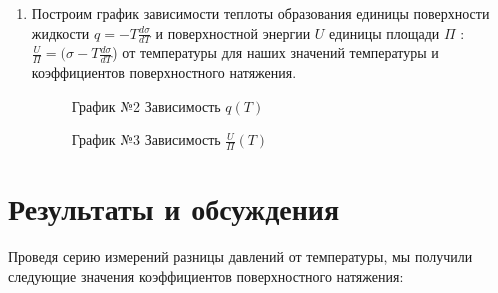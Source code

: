 \documentclass[a4paper]{article}
\begin{document}
\begin{enumerate}
\item Построим график зависимости теплоты образования единицы поверхности жидкости $q  = -T\frac{d\sigma}{dT} $  и поверхностной энергии $U$ единицы площади $\Pi$ : $\frac{U}{\Pi} = (\sigma - T\frac{d\sigma}{dT}$) от температуры для наших значений температуры и коэффициентов поверхностного натяжения.\\
\begin{figure}[h!]
\caption[]{\label{} График №2 Зависимость $q(T)$}
\end{figure}

\begin{figure}[h!]
\caption[]{\label{} График №3 Зависимость $\frac{U}{\Pi}(T)$}
\end{figure}
\end{enumerate}
\clearpage
\section{Результаты и обсуждения}
Проведя серию измерений разницы давлений от температуры, мы получили следующие значения коэффициентов поверхностного натяжения:\newline
\end{document}
